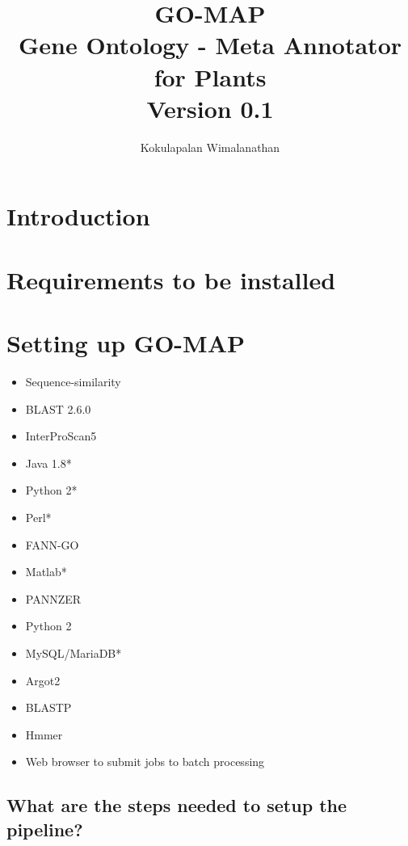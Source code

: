 \documentclass[11pt,letterpaper]{article}
\title{
  GO-MAP\\
  \Large{ Gene Ontology - Meta Annotator for Plants} \\
  \large {Version 0.1}
}
\author{Kokulapalan Wimalanathan}
\begin{document}

\maketitle
\newpage

\section{Introduction}





\section{Requirements to be installed}


\section{Setting up GO-MAP}


\begin{itemize}
 \item
       Sequence-similarity
 \item
       BLAST 2.6.0
 \item
       InterProScan5
 \item
       Java 1.8*
 \item
       Python 2*
 \item
       Perl*
 \item
       FANN-GO
 \item
       Matlab*
 \item
       PANNZER
 \item
       Python 2
 \item
       MySQL/MariaDB*
 \item
       Argot2
 \item
       BLASTP
 \item
       Hmmer
 \item
       Web browser to submit jobs to batch processing
\end{itemize}



\subsection{What are the steps needed to setup the pipeline?}\label{what-are-the-steps-needed-to-setup-the-pipeline}
\end{document}
